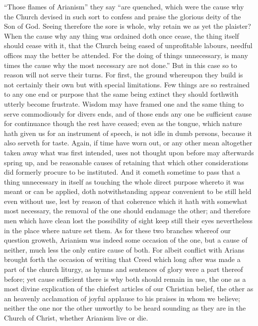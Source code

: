 “Those flames of Arianism” they say “are quenched, which were the cause why the Church devised in such sort to confess and praise the glorious deity of the Son of God. Seeing therefore the sore is whole, why retain we as yet the plaister? When the cause why any thing was ordained doth once cease, the thing itself should cease with it, that the Church being eased of unprofitable labours, needful offices may the better be attended. For the doing of things unnecessary, is many times the cause why the most necessary are not done.” But in this case so to reason will not serve their turns.
For first, the ground whereupon they build is not certainly their own but with special limitations. Few things are so restrained to any one end or purpose that the same being extinct they should forthwith utterly become frustrate. Wisdom may have framed one and the same thing to serve commodiously for divers ends, and of those ends any one be sufficient cause for continuance though the rest have ceased; even as  the tongue, which nature hath given us for an instrument of speech, is not idle in dumb persons, because it also serveth for taste. Again, if time have worn out, or any other mean altogether taken away what was first intended, uses not thought upon before may afterwards spring up, and be reasonable causes of retaining that which other considerations did formerly procure to be instituted. And it cometh sometime to pass that a thing unnecessary in itself as touching the whole direct purpose whereto it was meant or can be applied, doth notwithstanding appear convenient to be still held even without use, lest by reason of that coherence which it hath with somewhat most necessary, the removal of the one should endamage the other; and therefore men which have clean lost the possibility of sight keep still their eyes nevertheless in the place where nature set them.
As for these two branches whereof our question groweth, Arianism was indeed some occasion of the one, but a cause of neither, much less the only entire cause of both. For albeit conflict with Arians brought forth the occasion of writing that Creed which long after was made a part of the church liturgy, as hymns and sentences of glory were a part thereof before; yet cause sufficient there is why both should remain in use, the one as a most divine explication of the chiefest articles of our Christian belief, the other as an heavenly acclamation of joyful applause to his praises in whom we believe; neither the one nor the other unworthy to be heard sounding as they are in the Church of Christ, whether Arianism live or die.
